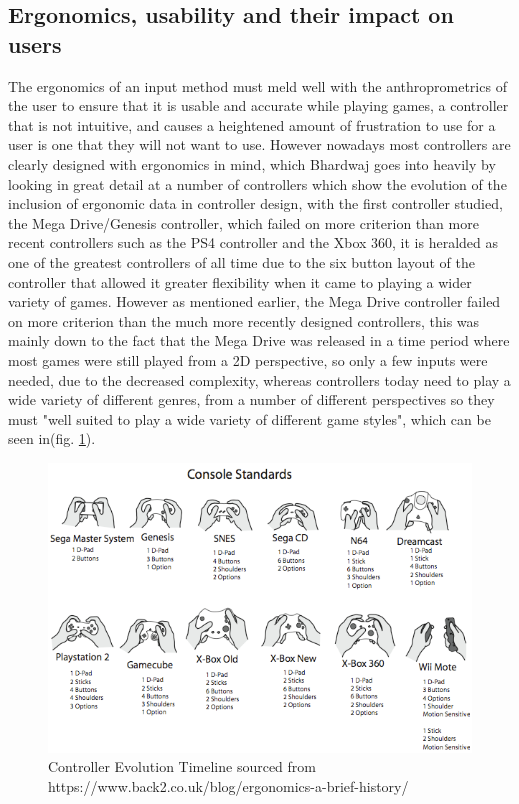 \documentclass[journal]{IEEEtran}
\begin{document}
\subsection{Ergonomics, usability and their impact on users} \label{A*PF}
The ergonomics of an input method must meld well with the anthroprometrics of the user to ensure that it is usable and accurate while playing games, a controller that is not intuitive, and causes a heightened amount of frustration to use for a user is one that they will not want to use\cite{brown2013evaluating}. However nowadays most controllers are clearly designed with ergonomics in mind, which Bhardwaj\cite{omichands} goes into heavily by looking in great detail at a number of controllers which show the evolution of the inclusion of ergonomic data in controller design, with the first controller studied, the Mega Drive/Genesis controller, which failed on more criterion than more recent controllers such as the PS4 controller and the Xbox 360, it is heralded as one of the greatest controllers of all time\cite{top25} due to the six button layout of the controller that allowed it greater flexibility when it came to playing a wider variety of games. However as mentioned earlier, the Mega Drive controller failed on more criterion than the much more recently designed controllers, this was mainly down to the fact that the Mega Drive was released in a time period where most games were still played from a 2D perspective, so only a few inputs were needed, due to the decreased complexity\cite{6000321,megadrive}, whereas controllers today need to play a wide variety of different genres, from a number of different perspectives so they must "well suited to play a wide variety of different game styles"\cite{brown2013evaluating}, which can be seen in(fig. \ref{fig:timeline}).

\begin{figure}
    \centering
    \includegraphics[width=1.0\linewidth]{evolution_of_gamecontroller.png}
    \caption{Controller Evolution Timeline sourced from https://www.back2.co.uk/blog/ergonomics-a-brief-history/}
    \label{fig:timeline}
\end{figure}
\end{document}
